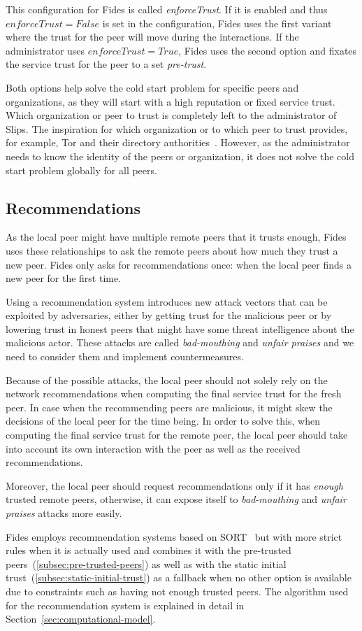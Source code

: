 This configuration for Fides is called \textit{enforceTrust}. If it is enabled and thus $enforceTrust = False$ is set in the configuration, Fides uses the first variant where the trust for the peer will move during the interactions. If the administrator uses $enforceTrust = True$, Fides uses the second option and fixates the service trust for the peer to a set \textit{pre-trust}.

Both options help solve the cold start problem for specific peers and organizations, as they will start with a high reputation or fixed service trust. Which organization or peer to trust is completely left to the administrator of Slips. 
The inspiration for which organization or to which peer to trust provides, for example, Tor and their directory authorities~\cite{torauth}. However, as the administrator needs to know the identity of the peers or organization, it does not solve the cold start problem globally for all peers.

\subsection{Recommendations}
\label{subsec:recommendations}
As the local peer might have multiple remote peers that it trusts enough, Fides uses these relationships to ask the remote peers about how much they trust a new peer. Fides only asks for recommendations once: when the local peer finds a new peer for the first time.  

Using a recommendation system introduces new attack vectors that can be exploited by adversaries, either by getting trust for the malicious peer or by lowering trust in honest peers that might have some threat intelligence about the malicious actor. 
These attacks are called \textit{bad-mouthing} and \textit{unfair praises} and we need to consider them and implement countermeasures.

Because of the possible attacks, the local peer should not solely rely on the network recommendations when computing the final service trust for the fresh peer. In case when the recommending peers are malicious, it might skew the decisions of the local peer for the time being.
In order to solve this, when computing the final service trust for the remote peer, the local peer should take into account its own interaction with the peer as well as the received recommendations.

Moreover, the local peer should request recommendations only if it has \textit{enough} trusted remote peers, otherwise, it can expose itself to \textit{bad-mouthing} and \textit{unfair praises} attacks more easily.

\vspace{7mm}

Fides employs recommendation systems based on SORT~\cite{sort} but with more strict rules when it is actually used and combines it with the pre-trusted peers~(\ref{subsec:pre-trusted-peers}) as well as with the static initial trust~(\ref{subsec:static-initial-trust}) as a fallback when no other option is available due to constraints such as having not enough trusted peers.
The algorithm used for the recommendation system is explained in detail in Section~\ref{sec:computational-model}.